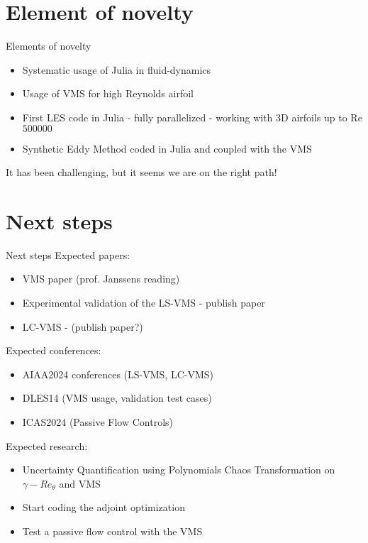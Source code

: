\documentclass{beamer}
\begin{document}
\section{Element of novelty}
\begin{frame}{Elements of novelty}
\begin{itemize}
	\item Systematic usage of Julia in fluid-dynamics
	\item Usage of VMS for high Reynolds airfoil
	\item First LES code in Julia - fully parallelized - working with 3D airfoils up to Re $\num{500000}$ 
	\item Synthetic Eddy Method coded in Julia and coupled with the VMS
\end{itemize}

It has been challenging, but it seems we are on the right path!

\end{frame}

\section{Next steps}
\begin{frame}{Next steps}
Expected papers:
\begin{itemize}
	\item VMS paper (prof. Janssens reading)
	\item Experimental validation of the LS-VMS - publish paper
	\item LC-VMS - (publish paper?)
\end{itemize}

Expected conferences:
\begin{itemize}
	\item AIAA2024 conferences (LS-VMS, LC-VMS)
	\item DLES14 (VMS usage, validation test cases)
	\item ICAS2024 (Passive Flow Controls)
\end{itemize}


Expected research:
\begin{itemize}
	\item Uncertainty Quantification using Polynomials Chaos Transformation on $\gamma-Re_\theta$ and VMS
	\item Start coding the adjoint optimization
	\item Test a passive flow control with the VMS
\end{itemize}

\end{frame}
\end{document}
